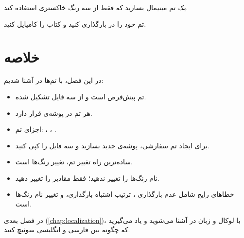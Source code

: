 \begin{exercise}
    یک تم مینیمال بسازید که فقط از سه
    رنگ خاکستری استفاده کند.
    \label{exc:themes-minimal}
\end{exercise}

\begin{exercise}
    تم خود را در  بارگذاری
    کنید و کتاب را کامپایل کنید.
    \label{exc:themes-load}
\end{exercise}

\section{خلاصه}
\label{sec:themes-summary}

در این فصل، با تم‌ها در 
آشنا شدیم:

\begin{itemize}
    \item تم پیش‌فرض  است و از
    سه فایل تشکیل شده.

    \item هر تم در پوشه‌ی
     قرار دارد.

    \item اجزای تم: ،
    ،
    .

    \item برای ایجاد تم سفارشی، پوشه‌ی جدید
    بسازید و سه فایل را کپی کنید.

    \item ساده‌ترین راه تغییر تم، تغییر
    رنگ‌ها است.

    \item نام رنگ‌ها را تغییر ندهید؛ فقط
    مقادیر  را تغییر دهید.

    \item خطاهای رایج شامل عدم بارگذاری
    ، ترتیب اشتباه
    بارگذاری، و تغییر نام رنگ‌ها است.
\end{itemize}

در فصل بعدی (\cref{chap:localization})،
با لوکال و زبان در  آشنا
می‌شوید و یاد می‌گیرید که چگونه بین فارسی
و انگلیسی سوئیچ کنید.